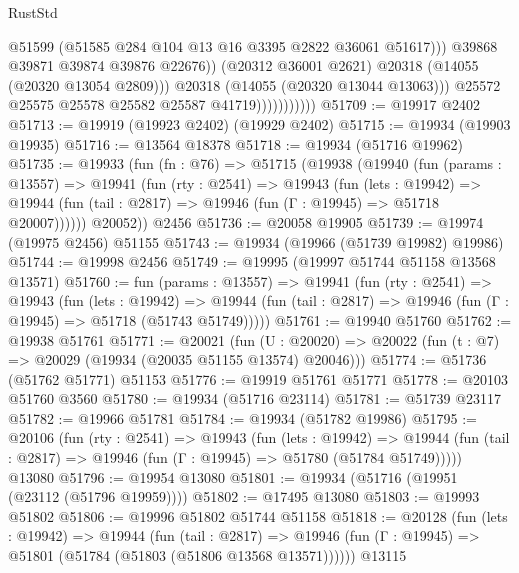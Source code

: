 \begin{lexlean}{RustStd}
\begin{coremodule}
                                      @51599
                                      (@51585 @284 @104 @13 @16 @3395 @2822 @36061 @51617)))
                                  @39868
                                  @39871
                                  @39874
                                  @39876
                                  @22676))
                              (@20312 @36001 @2621)
                              @20318
                              (@14055 (@20320 @13054 @2809)))
                            @20318
                            (@14055 (@20320 @13044 @13063)))
                          @25572
                          @25575
                          @25578
                          @25582
                          @25587
                          @41719)))))))))))
@51709 := @19917 @2402
@51713 := @19919 (@19923 @2402) (@19929 @2402)
@51715 := @19934 (@19903 @19935)
@51716 := @13564 @18378
@51718 := @19934 (@51716 @19962)
@51735 := @19933
    (fun (fn : @76) =>
    @51715
      (@19938
        (@19940
          (fun (params : @13557) =>
          @19941
            (fun (rty : @2541) =>
            @19943
              (fun (lets : @19942) =>
              @19944 (fun (tail : @2817) => @19946 (fun (Γ : @19945) => @51718 @20007))))))
        @20052))
    @2456
@51736 := @20058 @19905
@51739 := @19974 (@19975 @2456) @51155
@51743 := @19934 (@19966 (@51739 @19982) @19986)
@51744 := @19998 @2456
@51749 := @19995 (@19997 @51744 @51158 @13568 @13571)
@51760 := fun (params : @13557) =>
  @19941
    (fun (rty : @2541) =>
    @19943
      (fun (lets : @19942) =>
      @19944 (fun (tail : @2817) => @19946 (fun (Γ : @19945) => @51718 (@51743 @51749)))))
@51761 := @19940 @51760
@51762 := @19938 @51761
@51771 := @20021
    (fun (U : @20020) => @20022 (fun (t : @7) => @20029 (@19934 (@20035 @51155 @13574) @20046)))
@51774 := @51736 (@51762 @51771) @51153
@51776 := @19919 @51761 @51771
@51778 := @20103 @51760 @3560
@51780 := @19934 (@51716 @23114)
@51781 := @51739 @23117
@51782 := @19966 @51781
@51784 := @19934 (@51782 @19986)
@51795 := @20106
    (fun (rty : @2541) =>
    @19943
      (fun (lets : @19942) =>
      @19944 (fun (tail : @2817) => @19946 (fun (Γ : @19945) => @51780 (@51784 @51749)))))
    @13080
@51796 := @19954 @13080
@51801 := @19934 (@51716 (@19951 (@23112 (@51796 @19959))))
@51802 := @17495 @13080
@51803 := @19993 @51802
@51806 := @19996 @51802 @51744 @51158
@51818 := @20128
    (fun (lets : @19942) =>
    @19944
      (fun (tail : @2817) =>
      @19946 (fun (Γ : @19945) => @51801 (@51784 (@51803 (@51806 @13568 @13571))))))
    @13115

\end{coremodule}
\end{lexlean}
